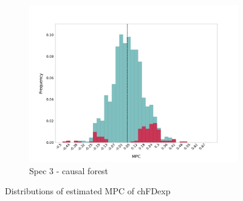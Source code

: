 \begin{figure}[t]
\begin{subfigure}{0.33\linewidth}
        \includegraphics[width=\linewidth]{figures/distributions/spec3_cf_chFDexp.png}
        \caption{Spec 3 - causal forest}
    \end{subfigure}\hfill
    \caption{Distributions of estimated MPC of chFDexp}
\end{figure}
